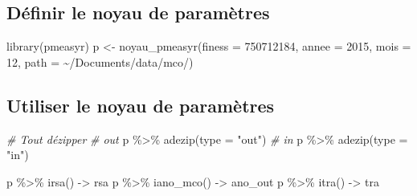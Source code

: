 \documentclass[
]{book}
\newenvironment{Shaded}{\begin{snugshade}}{\end{snugshade}}
\newcommand{\AttributeTok}[1]{\textcolor[rgb]{0.77,0.63,0.00}{#1}}
\newcommand{\CommentTok}[1]{\textcolor[rgb]{0.56,0.35,0.01}{\textit{#1}}}
\newcommand{\DecValTok}[1]{\textcolor[rgb]{0.00,0.00,0.81}{#1}}
\newcommand{\FunctionTok}[1]{\textcolor[rgb]{0.00,0.00,0.00}{#1}}
\newcommand{\NormalTok}[1]{#1}
\newcommand{\OtherTok}[1]{\textcolor[rgb]{0.56,0.35,0.01}{#1}}
\newcommand{\SpecialCharTok}[1]{\textcolor[rgb]{0.00,0.00,0.00}{#1}}
\newcommand{\StringTok}[1]{\textcolor[rgb]{0.31,0.60,0.02}{#1}}
\begin{document}
\hypertarget{duxe9finir-le-noyau-de-paramuxe8tres}{%
\subsection{Définir le noyau de paramètres}\label{duxe9finir-le-noyau-de-paramuxe8tres}}

\begin{Shaded}
\begin{Highlighting}[]
\FunctionTok{library}\NormalTok{(pmeasyr)}
\NormalTok{p }\OtherTok{\textless{}{-}} \FunctionTok{noyau\_pmeasyr}\NormalTok{(}\AttributeTok{finess =} \StringTok{\textquotesingle{}750712184\textquotesingle{}}\NormalTok{, }
                   \AttributeTok{annee =} \DecValTok{2015}\NormalTok{, }
                   \AttributeTok{mois =} \DecValTok{12}\NormalTok{, }
                   \AttributeTok{path   =} \StringTok{\textquotesingle{}\textasciitilde{}/Documents/data/mco/\textquotesingle{}}\NormalTok{)}
\end{Highlighting}
\end{Shaded}

\hypertarget{utiliser-le-noyau-de-paramuxe8tres}{%
\subsection{Utiliser le noyau de paramètres}\label{utiliser-le-noyau-de-paramuxe8tres}}

\begin{Shaded}
\begin{Highlighting}[]
\CommentTok{\# Tout dézipper}
\CommentTok{\# out}
\NormalTok{p }\SpecialCharTok{\%\textgreater{}\%} \FunctionTok{adezip}\NormalTok{(}\AttributeTok{type =} \StringTok{"out"}\NormalTok{)}
\CommentTok{\# in}
\NormalTok{p }\SpecialCharTok{\%\textgreater{}\%} \FunctionTok{adezip}\NormalTok{(}\AttributeTok{type =} \StringTok{"in"}\NormalTok{)}
\end{Highlighting}
\end{Shaded}

\begin{Shaded}
\begin{Highlighting}[]
\NormalTok{p }\SpecialCharTok{\%\textgreater{}\%} \FunctionTok{irsa}\NormalTok{()     }\OtherTok{{-}\textgreater{}}\NormalTok{ rsa}
\NormalTok{p }\SpecialCharTok{\%\textgreater{}\%} \FunctionTok{iano\_mco}\NormalTok{() }\OtherTok{{-}\textgreater{}}\NormalTok{ ano\_out}
\NormalTok{p }\SpecialCharTok{\%\textgreater{}\%} \FunctionTok{itra}\NormalTok{()     }\OtherTok{{-}\textgreater{}}\NormalTok{ tra}
\end{Highlighting}
\end{Shaded}
\end{document}
